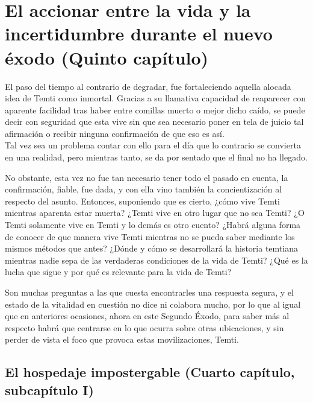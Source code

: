 \documentclass[
  spanish,
]{book}
\begin{document}
\hypertarget{el-accionar-entre-la-vida-y-la-incertidumbre-durante-el-nuevo-uxe9xodo-quinto-capuxedtulo}{%
\chapter{El accionar entre la vida y la incertidumbre durante el nuevo éxodo (Quinto capítulo)}\label{el-accionar-entre-la-vida-y-la-incertidumbre-durante-el-nuevo-uxe9xodo-quinto-capuxedtulo}}

El paso del tiempo al contrario de degradar, fue fortaleciendo aquella alocada idea de Temti como inmortal. Gracias a su llamativa capacidad de reaparecer con aparente facilidad tras haber entre comillas muerto o mejor dicho caído, se puede decir con seguridad que esta vive sin que sea necesario poner en tela de juicio tal afirmación o recibir ninguna confirmación de que eso es así.\\
Tal vez sea un problema contar con ello para el día que lo contrario se convierta en una realidad, pero mientras tanto, se da por sentado que el final no ha llegado.

No obstante, esta vez no fue tan necesario tener todo el pasado en cuenta, la confirmación, fiable, fue dada, y con ella vino también la concientización al respecto del asunto. Entonces, suponiendo que es cierto, ¿cómo vive Temti mientras aparenta estar muerta? ¿Temti vive en otro lugar que no sea Temti? ¿O Temti solamente vive en Temti y lo demás es otro cuento? ¿Habrá alguna forma de conocer de que manera vive Temti mientras no se pueda saber mediante los mismos métodos que antes? ¿Dónde y cómo se desarrollará la historia temtiana mientras nadie sepa de las verdaderas condiciones de la vida de Temti? ¿Qué es la lucha que sigue y por qué es relevante para la vida de Temti?

Son muchas preguntas a las que cuesta encontrarles una respuesta segura, y el estado de la vitalidad en cuestión no dice ni colabora mucho, por lo que al igual que en anteriores ocasiones, ahora en este Segundo Éxodo, para saber más al respecto habrá que centrarse en lo que ocurra sobre otras ubicaciones, y sin perder de vista el foco que provoca estas movilizaciones, Temti.

\hypertarget{el-hospedaje-impostergable-cuarto-capuxedtulo-subcapuxedtulo-i}{%
\section{El hospedaje impostergable (Cuarto capítulo, subcapítulo I)}\label{el-hospedaje-impostergable-cuarto-capuxedtulo-subcapuxedtulo-i}}
\end{document}
